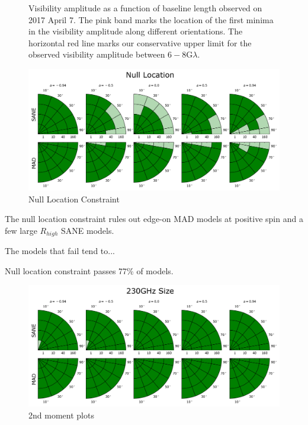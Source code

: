 \begin{figure}
  \centering
  [altex]
  \caption{Visibility amplitude as a function of baseline length
    observed on 2017 April 7.
    The pink band marks the location of the first minima in the
    visibility amplitude along different orientations.
    The horizontal red line marks our conservative upper limit for the
    observed visibility amplitude between $6-8$G$\lambda$.}
  \label{fig:cmp_null}
\end{figure}

\begin{figure}
  \centering
  \includegraphics[width=\columnwidth]{./figures/Null_loc_Constraints.png}
  \caption{Null Location Constraint}
  \label{fig:cmp_ozel}
\end{figure}

The null location constraint rules out edge-on MAD models at positive spin and a few large $R_{high}$ SANE models.

The models that fail tend to...

Null location constraint passes 77\% of models.


\begin{figure}
  \centering
  \includegraphics[width=\columnwidth]{./figures/230GHz_size_Constraints.png}
  \caption{2nd moment plots}
  \label{fig:cmp_2nd_moment}
\end{figure}


